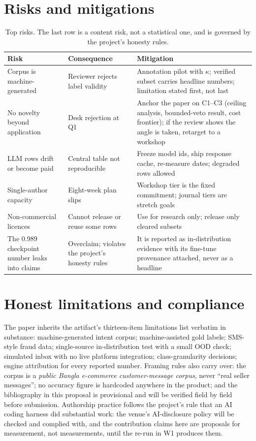\documentclass[11pt]{article}
\begin{document}
\section{Risks and mitigations}
\begin{table}[htbp]
\centering
\small
\begin{tabular}{@{}p{4.9cm}p{4.6cm}p{4.6cm}@{}}
\toprule
Risk & Consequence & Mitigation \\
\midrule
Corpus is machine-generated & Reviewer rejects label validity & Annotation
pilot with $\kappa$; verified subset carries headline numbers; limitation
stated first, not last \\
No novelty beyond application & Desk rejection at Q1 & Anchor the paper on
C1--C3 (ceiling analysis, bounded-veto result, cost frontier); if the review
shows the angle is taken, retarget to a workshop \\
LLM rows drift or become paid & Central table not reproducible & Freeze model
ids, ship response cache, re-measure dates; degraded rows allowed \\
Single-author capacity & Eight-week plan slips & Workshop tier is the fixed
commitment; journal tiers are stretch goals \\
Non-commercial licences & Cannot release or reuse some rows & Use for
research only; release only cleared subsets \\
The 0.989 checkpoint number leaks into claims & Overclaim; violates the
project's honesty rules & It is reported as in-distribution evidence with its
fine-tune provenance attached, never as a headline \\
\bottomrule
\end{tabular}
\caption{Top risks. The last row is a content risk, not a statistical one, and
is governed by the project's honesty rules.}
\label{tab:risks}
\end{table}

\section{Honest limitations and compliance}
The paper inherits the artifact's thirteen-item limitations list verbatim in
substance: machine-generated intent corpus; machine-assisted gold labels;
SMS-style fraud data; single-source in-distribution test with a small OOD
check; simulated inbox with no live platform integration; class-granularity
decisions; engine attribution for every reported number. Framing rules also
carry over: the corpus is a \emph{public Bangla e-commerce customer-message
corpus}, never ``real seller messages''; no accuracy figure is hardcoded
anywhere in the product; and the bibliography in this proposal is provisional
and will be verified field by field before submission. Authorship practice
follows the project's rule that an AI coding harness did substantial work: the
venue's AI-disclosure policy will be checked and complied with, and the
contribution claims here are proposals for measurement, not measurements, until
the re-run in W1 produces them.
\end{document}
